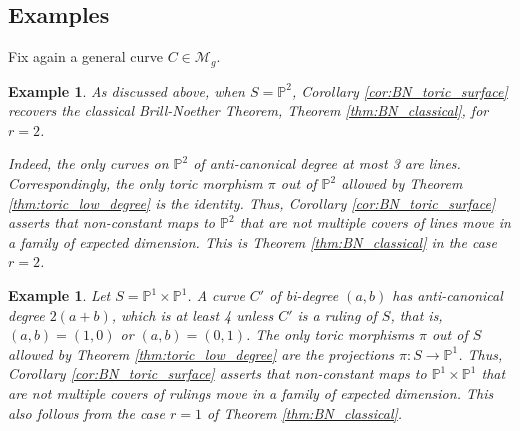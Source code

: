 \documentclass[12pt]{amsart}
\def\cM{{\mathcal{M}}}
\def\P{\mathbb{P}}
\def\bP{\mathbb{P}}
\newtheorem{example}[definition]{Example}
\begin{document}


\subsection{Examples}

Fix again a general curve $C\in\cM_g$. 

\begin{example}
As discussed above, when $S=\bP^2$, Corollary \ref{cor:BN_toric_surface} recovers the classical Brill-Noether Theorem, Theorem \ref{thm:BN_classical}, for $r=2$. 

Indeed, the only curves on $\bP^2$ of anti-canonical degree at most 3 are lines. Correspondingly, the only toric morphism $\pi$ out of $\bP^2$ allowed by Theorem \ref{thm:toric_low_degree} is the identity. Thus, Corollary \ref{cor:BN_toric_surface} asserts that non-constant maps to $\bP^2$ that are not multiple covers of lines move in a family of expected dimension. This is Theorem \ref{thm:BN_classical} in the case $r=2$.
\end{example}

\begin{example}
Let $S=\bP^1\times \bP^1$. A curve $C'$ of bi-degree $(a,b)$ has anti-canonical degree $2(a+b)$, which is at least 4 unless $C'$ is a ruling of $S$, that is, $(a,b)=(1,0)$ or $(a,b)=(0,1)$. The only toric morphisms $\pi$ out of $S$ allowed by Theorem \ref{thm:toric_low_degree} are the projections $\pi:S\to \bP^1$.  Thus, Corollary \ref{cor:BN_toric_surface} asserts that non-constant maps to $\bP^1\times \bP^1$ that are not multiple covers of rulings move in a family of expected dimension. This also follows from the case $r=1$ of Theorem \ref{thm:BN_classical}.
\end{example}
\end{document}

